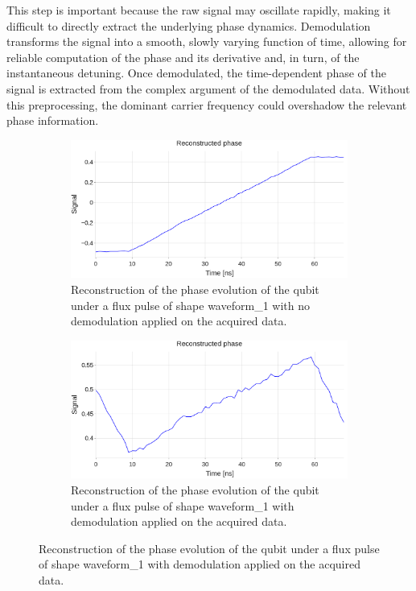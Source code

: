 This step is important because the raw signal may oscillate rapidly, making it difficult to directly extract the underlying phase dynamics. 
Demodulation transforms the signal into a smooth, slowly varying function of time, allowing for reliable computation of the phase and its derivative and, in turn, of the instantaneous detuning.
Once demodulated, the time-dependent phase of the signal is extracted from the complex argument of the demodulated data. 
Without this preprocessing, the dominant carrier frequency could overshadow the relevant phase information.

\begin{figure}[h!]
    \centering
    \begin{subfigure}[t]{0.495\textwidth}
        \includegraphics[width=\textwidth]{figures/png/Cryoscope/no_demod/phase.png}
        \caption{Reconstruction of the phase evolution of the qubit under a flux pulse of shape waveform\_1 with no demodulation applied on the acquired data.}
        \label{fig:no_demodulation:step}
    \end{subfigure}
    \hfill
    \begin{subfigure}[t]{0.495\textwidth}
        \includegraphics[width=\textwidth]{figures/png/Cryoscope/demodulation/phase.png}
        \caption{Reconstruction of the phase evolution of the qubit under a flux pulse of shape waveform\_1 with demodulation applied on the acquired data.}
        \label{fig:demodulation:step}
    \end{subfigure}


\end{figure}
